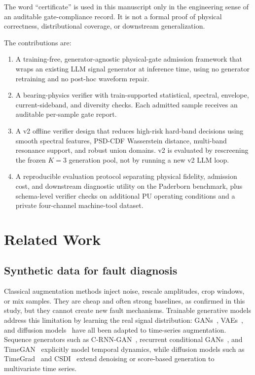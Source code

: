 \documentclass[review,3p,times]{elsarticle}
\begin{document}
The word ``certificate'' is used in this manuscript only in the engineering
sense of an auditable gate-compliance record. It is not a formal proof of
physical correctness, distributional coverage, or downstream generalization.

The contributions are:
\begin{enumerate}
  \item A training-free, generator-agnostic physical-gate admission framework that
  wraps an existing LLM signal generator at inference time, using no generator
  retraining and no post-hoc waveform repair.
  \item A bearing-physics verifier with train-supported statistical,
  spectral, envelope, current-sideband, and diversity checks. Each admitted
  sample receives an auditable per-sample gate report.
  \item A v2 offline verifier design that reduces high-risk hard-band decisions using
  smooth spectral features, PSD-CDF Wasserstein distance, multi-band
  resonance support, and robust union domains. v2 is evaluated by rescreening
  the frozen $K{=}3$ generation pool, not by running a new v2 LLM loop.
  \item A reproducible evaluation protocol separating physical fidelity,
  admission cost, and downstream diagnostic utility on the Paderborn benchmark,
  plus schema-level verifier checks on additional PU operating conditions and a
  private four-channel machine-tool dataset.
\end{enumerate}

\section{Related Work}
\label{sec:related}

\subsection{Synthetic data for fault diagnosis}

Classical augmentation methods inject noise, rescale amplitudes, crop windows,
or mix samples. They are cheap and often strong baselines, as confirmed in
this study, but they cannot create new fault mechanisms. Trainable generative
models address this limitation by learning the real signal distribution:
GANs~\cite{goodfellow}, VAEs~\cite{kingma}, and diffusion
models~\cite{ho} have all been adapted to time-series augmentation. Sequence
generators such as C-RNN-GAN~\cite{mogren_crnngan}, recurrent conditional
GANs~\cite{esteban_rcgan}, and TimeGAN~\cite{timegan} explicitly model
temporal dynamics, while diffusion models such as TimeGrad~\cite{timegrad}
and CSDI~\cite{csdi} extend denoising or score-based generation to
multivariate time series.
\end{document}
